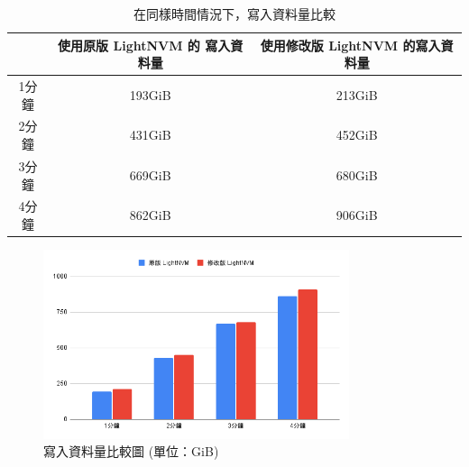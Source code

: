 \begin{table}[H]
    \begin{center}
        \caption{在同樣時間情況下，寫入資料量比較}\label{t4.2}
        \begin{tabular}{|c|c|c|}\hline
                & 使用原版 LightNVM 的 寫入資料量 & 使用修改版 LightNVM 的寫入資料量 \\\hline
            1分鐘 & 193GiB                & 213GiB                \\\hline
            2分鐘 & 431GiB                & 452GiB                \\\hline
            3分鐘 & 669GiB                & 680GiB                \\\hline
            4分鐘 & 862GiB                & 906GiB                \\\hline
        \end{tabular}
    \end{center}
\end{table}

\begin{figure}[H]
    \centering
    \includegraphics[width=0.8\textwidth]{picture/ch4/write_chart.png}
    \caption{寫入資料量比較圖 (單位：GiB)}
    \label{f4.2}
\end{figure}